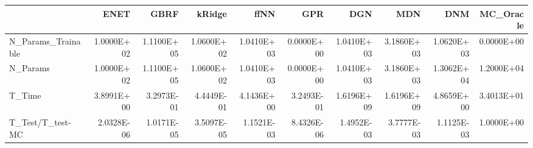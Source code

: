 \begin{tabular}{lrrrrrrrrr}
\toprule
{} &       ENET &       GBRF &     kRidge &       ffNN &        GPR &        DGN &        MDN &        DNM &  MC\_Oracle \\
\midrule
N\_Params\_Trainable & 1.0000E+02 & 1.1100E+05 & 1.0600E+02 & 1.0410E+03 & 0.0000E+00 & 1.0410E+03 & 3.1860E+03 & 1.0620E+03 & 0.0000E+00 \\
N\_Params           & 1.0000E+02 & 1.1100E+05 & 1.0600E+02 & 1.0410E+03 & 0.0000E+00 & 1.0410E+03 & 3.1860E+03 & 1.3062E+04 & 1.2000E+04 \\
T\_Time             & 3.8991E+00 & 3.2973E-01 & 4.4449E-01 & 4.1436E+00 & 3.2493E-01 & 1.6196E+09 & 1.6196E+09 & 4.8659E+00 & 3.4013E+01 \\
T\_Test/T\_test-MC   & 2.0328E-06 & 1.0171E-05 & 3.5097E-05 & 1.1521E-03 & 8.4326E-06 & 1.4952E-03 & 3.7777E-03 & 1.1125E-03 & 1.0000E+00 \\
\bottomrule
\end{tabular}
